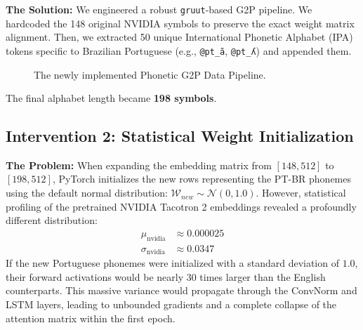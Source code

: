 \documentclass[12pt]{article}
\newcommand{\pathtt}[1]{\texttt{#1}}
\begin{document}
\textbf{The Solution:}
We engineered a robust \pathtt{gruut}-based G2P pipeline. We hardcoded the 148 original NVIDIA symbols to preserve the exact weight matrix alignment. Then, we extracted 50 unique International Phonetic Alphabet (IPA) tokens specific to Brazilian Portuguese (e.g., \pathtt{@pt\_ã}, \pathtt{@pt\_ʎ}) and appended them. 

\begin{figure}[H]
\centering
{}
\caption{The newly implemented Phonetic G2P Data Pipeline.}
\end{figure}

The final alphabet length became \textbf{198 symbols}.

\subsection{Intervention 2: Statistical Weight Initialization}
\textbf{The Problem:}
When expanding the embedding matrix from $[148, 512]$ to $[198, 512]$, PyTorch initializes the new rows representing the PT-BR phonemes using the default normal distribution: $\mathcal{W}_{new} \sim \mathcal{N}(0, 1.0)$. 
However, statistical profiling of the pretrained NVIDIA Tacotron 2 embeddings revealed a profoundly different distribution:
\begin{align}
\mu_{\text{nvidia}} &\approx 0.000025 \\
\sigma_{\text{nvidia}} &\approx 0.0347
\end{align}
If the new Portuguese phonemes were initialized with a standard deviation of $1.0$, their forward activations would be nearly 30 times larger than the English counterparts. This massive variance would propagate through the ConvNorm and LSTM layers, leading to unbounded gradients and a complete collapse of the attention matrix within the first epoch.
\end{document}
